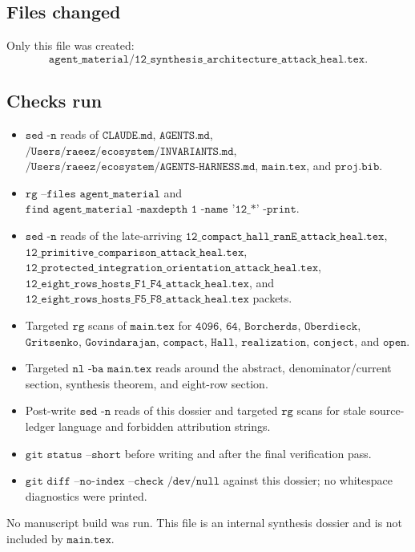 \subsection{Files changed}

Only this file was created:
\[
\texttt{agent\_material/12\_synthesis\_architecture\_attack\_heal.tex}.
\]

\subsection{Checks run}

\begin{itemize}
\item \(\texttt{sed -n}\) reads of \(\texttt{CLAUDE.md}\),
\(\texttt{AGENTS.md}\), \(\texttt{/Users/raeez/ecosystem/INVARIANTS.md}\),
\(\texttt{/Users/raeez/ecosystem/AGENTS-HARNESS.md}\),
\(\texttt{main.tex}\), and \(\texttt{proj.bib}\).
\item \(\texttt{rg --files agent\_material}\) and
\(\texttt{find agent\_material -maxdepth 1 -name '12\_*' -print}\).
\item \(\texttt{sed -n}\) reads of the late-arriving
\(\texttt{12\_compact\_hall\_ranE\_attack\_heal.tex}\),
\(\texttt{12\_primitive\_comparison\_attack\_heal.tex}\),
\(\texttt{12\_protected\_integration\_orientation\_attack\_heal.tex}\),
\(\texttt{12\_eight\_rows\_hosts\_F1\_F4\_attack\_heal.tex}\), and
\(\texttt{12\_eight\_rows\_hosts\_F5\_F8\_attack\_heal.tex}\) packets.
\item Targeted \(\texttt{rg}\) scans of \(\texttt{main.tex}\) for
\(\texttt{4096}\), \(\texttt{64}\), \(\texttt{Borcherds}\),
\(\texttt{Oberdieck}\), \(\texttt{Gritsenko}\), \(\texttt{Govindarajan}\),
\(\texttt{compact}\), \(\texttt{Hall}\), \(\texttt{realization}\),
\(\texttt{conject}\), and \(\texttt{open}\).
\item Targeted \(\texttt{nl -ba main.tex}\) reads around the abstract,
denominator/current section, synthesis theorem, and eight-row section.
\item Post-write \(\texttt{sed -n}\) reads of this dossier and targeted
\(\texttt{rg}\) scans for stale source-ledger language and forbidden
attribution strings.
\item \(\texttt{git status --short}\) before writing and after the final
verification pass.
\item \(\texttt{git diff --no-index --check /dev/null}\) against this
dossier; no whitespace diagnostics were printed.
\end{itemize}

No manuscript build was run.  This file is an internal synthesis dossier
and is not included by \(\texttt{main.tex}\).
